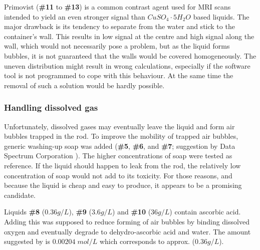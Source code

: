 \vspace{1cm}

Primovist (\textbf{\#11} to \textbf{\#13}) is a common contrast agent used for MRI scans \cite{VanBeers2012, Rohrer, primovist} intended to yield an even stronger signal than $CuSO_4\cdot5H_2O$ based liquids.
The major drawback is its tendency to separate from the water and stick to the container's wall.
This results in low signal at the centre and high signal along the wall, which would not necessarily pose a problem, but as the liquid forms bubbles, it is not guaranteed that the walls would be covered homogeneously.
The uneven distribution might result in wrong calculations, especially if the software tool is not programmed to cope with this behaviour.
At the same time the removal of such a solution would be hardly possible.

\subsubsection{Handling dissolved gas}
Unfortunately, dissolved gases may eventually leave the liquid and form air bubbles trapped in the rod.
To improve the mobility of trapped air bubbles, generic washing-up soap was added (\textbf{\#5}, \textbf{\#6}, and \textbf{\#7}; suggestion by Data Spectrum Corporation \cite{bubbles}).
The higher concentrations of soap were tested as reference.
If the liquid should happen to leak from the rod, the relatively low concentration of soap would not add to its toxicity.
For those reasons, and because the liquid is cheap and easy to produce, it appears to be a promising candidate.

\vspace{1cm}

Liquids \textbf{\#8} ($0.36 g/L$), \textbf{\#9} ($3.6 g/L$) and \textbf{\#10} ($36 g/L$) contain ascorbic acid.
Adding this was supposed to reduce forming of air bubbles by binding dissolved oxygen and eventually degrade to dehydro-ascorbic acid and water.
The amount suggested by \cite{Abtahi2008, Bodannes1979} is $0.00204 \; mol/L$ which corresponds to approx. ($0.36 g/L$).

\vspace{1cm}

